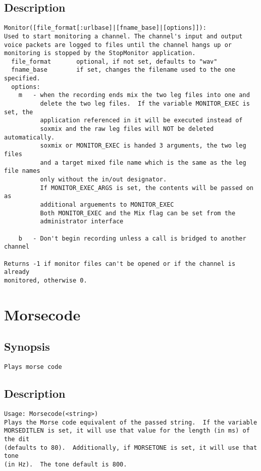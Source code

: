 \subsection{Description}
\begin{verbatim}
Monitor([file_format[:urlbase]|[fname_base]|[options]]):
Used to start monitoring a channel. The channel's input and output
voice packets are logged to files until the channel hangs up or
monitoring is stopped by the StopMonitor application.
  file_format		optional, if not set, defaults to "wav"
  fname_base		if set, changes the filename used to the one specified.
  options:
    m   - when the recording ends mix the two leg files into one and
          delete the two leg files.  If the variable MONITOR_EXEC is set, the
          application referenced in it will be executed instead of
          soxmix and the raw leg files will NOT be deleted automatically.
          soxmix or MONITOR_EXEC is handed 3 arguments, the two leg files
          and a target mixed file name which is the same as the leg file names
          only without the in/out designator.
          If MONITOR_EXEC_ARGS is set, the contents will be passed on as
          additional arguements to MONITOR_EXEC
          Both MONITOR_EXEC and the Mix flag can be set from the
          administrator interface

    b   - Don't begin recording unless a call is bridged to another channel

Returns -1 if monitor files can't be opened or if the channel is already
monitored, otherwise 0.

\end{verbatim}


\section{Morsecode}
\subsection{Synopsis}
\begin{verbatim}
Plays morse code
\end{verbatim}
\subsection{Description}
\begin{verbatim}
Usage: Morsecode(<string>)
Plays the Morse code equivalent of the passed string.  If the variable
MORSEDITLEN is set, it will use that value for the length (in ms) of the dit
(defaults to 80).  Additionally, if MORSETONE is set, it will use that tone
(in Hz).  The tone default is 800.

\end{verbatim}


